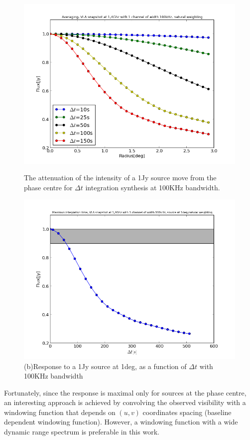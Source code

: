 \documentclass[useAMS,usenatbib]{mn2e}
\begin{document}
\begin{figure}
  \centering
  \begin{minipage}{0.38\linewidth}\includegraphics[width=1\textwidth]{./Figures/effect_time_averaging.png}\caption{The attenuation of the 
intensity of a 1Jy source move from the phase centre for $\Delta t$ integration synthesis at 100KHz 
bandwidth.}\label{timessear1}\end{minipage}
\begin{minipage}{0.38\linewidth}\includegraphics[width=1\textwidth]{./Figures/maximun_integration.png}\caption{(b)Response to a 1Jy 
source at 1deg, as a function of $\Delta t$ with 100KHz bandwidth}\label{timessear11}\end{minipage}
\end{figure}
Fortunately, since the response is maximal only for sources at the phase centre, an interesting approach is achieved by convolving the 
observed visibility with a  windowing function that depends on $(u,v)$ coordinates spacing (baseline dependent windowing function). 
However, a windowing function with a wide dynamic range spectrum is preferable in this work.
\end{document}
